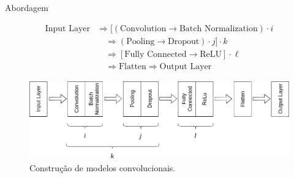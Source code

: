 \begin{frame}{Abordagem}
    
\begin{figure}
    \centering
    \begin{small}
    \begin{equation}
        \begin{split}
        \textrm{Input Layer} & \Rightarrow [ (\textrm{Convolution} \rightarrow \textrm{Batch Normalization})\cdot i\\
         &\quad \Rightarrow (\textrm{Pooling} \rightarrow \textrm{Dropout})\cdot j]\cdot k \\
         &\quad \Rightarrow [\textrm{Fully Connected} \rightarrow \textrm{ReLU}]\cdot \ell \\
         &\quad \Rightarrow \textrm{Flatten} \Rightarrow \textrm{Output Layer}
        \end{split}
    \end{equation}
    \end{small}
    \includegraphics[width=1.0\linewidth]{img/cnn_build.png}
    \caption{Construção de modelos convolucionais.}
\end{figure}
    
\end{frame}